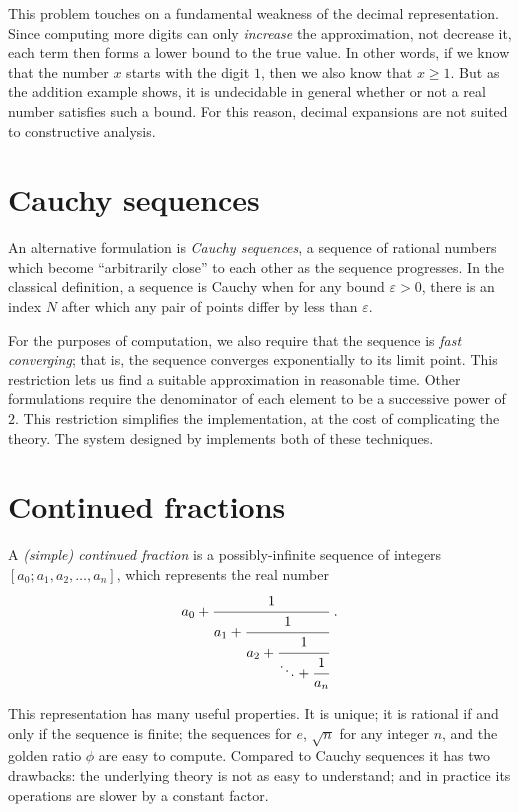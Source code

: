 \documentclass[leqno]{report}
\begin{document}
This problem touches on a fundamental weakness of the decimal representation. Since computing more digits can only \emph{increase} the approximation, not decrease it, each term then forms a lower bound to the true value. In other words, if we know that the number $x$ starts with the digit $1$, then we also know that $x \geq 1$. But as the addition example shows, it is undecidable in general whether or not a real number satisfies such a bound. For this reason, decimal expansions are not suited to constructive analysis.

\section{Cauchy sequences}

An alternative formulation is \textit{Cauchy sequences}, a sequence of rational numbers which become ``arbitrarily close'' to each other as the sequence progresses. In the classical definition, a sequence is Cauchy when for any bound $\varepsilon > 0$, there is an index $N$ after which any pair of points differ by less than $\varepsilon$.

For the purposes of computation, we also require that the sequence is \textit{fast converging}; that is, the sequence converges exponentially to its limit point. This restriction lets us find a suitable approximation in reasonable time. Other formulations require the denominator of each element to be a successive power of $2$. This restriction simplifies the implementation, at the cost of complicating the theory. The system designed by \citet{gowland2000correctness} implements both of these techniques.

\section{Continued fractions}

A \textit{(simple) continued fraction} is a possibly-infinite sequence of integers $[a_0; a_1, a_2, \ldots, a_n]$, which represents the real number
\[
    a_0 + \cfrac{1}{a_1 + \cfrac{1}{a_2 + \cfrac{1}{\ddots + \cfrac{1}{a_n}}}}
    \ .
\]

This representation has many useful properties. It is unique; it is rational if and only if the sequence is finite; the sequences for $e$, $\sqrt{n}$ for any integer $n$, and the golden ratio $\phi$ are easy to compute. Compared to Cauchy sequences it has two drawbacks: the underlying theory is not as easy to understand; and in practice its operations are slower by a constant factor.
\end{document}
